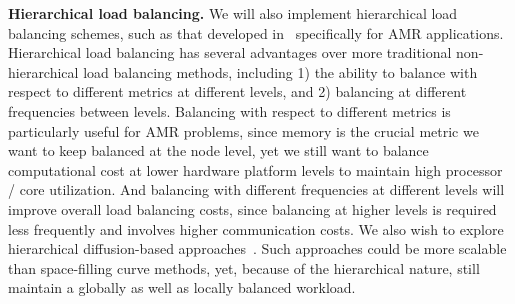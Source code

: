 \documentclass[11pt,letterpaper]{article}
\begin{document}

\textbf{Hierarchical load balancing.} 
%
We will also implement hierarchical load balancing schemes, such as
that developed in~\cite{LaTa06} specifically for AMR applications.
Hierarchical load balancing has several advantages over more
traditional non-hierarchical load balancing methods, including 1) the
ability to balance with respect to different metrics at different
levels, and 2) balancing at different frequencies between levels.
Balancing with respect to different metrics is particularly useful for
AMR problems, since memory is the crucial metric we want to keep
balanced at the node level, yet we still want to balance computational
cost at lower hardware platform levels to maintain high processor /
core utilization.  And balancing with different frequencies at
different levels will improve overall load balancing costs, since
balancing at higher levels is required less frequently and involves
higher communication costs.  We also wish to explore hierarchical
diffusion-based approaches~\cite{ScKa97}.  Such approaches could be
more scalable than space-filling curve methods, yet, because of the
hierarchical nature, still maintain a globally as well as locally
balanced workload.

% 
\end{document}
